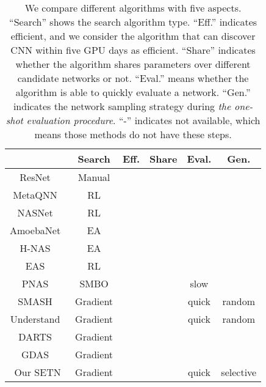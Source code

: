 \documentclass[10pt,twocolumn,letterpaper]{article}
\def\NAME{{SETN}}
\begin{document}
\begin{table}[t!]
\centering
\setlength{\tabcolsep}{2.6pt}
\begin{tabular}{| c | c | c | c | c | c |}\hline
                                         & Search    &   Eff.    & Share    & Eval.  & Gen. \\
\hline
  ResNet~\cite{he2016deep}               & Manual    &   &       &     &     \\
\hline
  MetaQNN~\cite{baker2017designing}      & RL        &   &  &     &     \\
  NASNet~\cite{Zoph_2018_CVPR}           & RL        &   &  &     &     \\
  AmoebaNet~\cite{real2019regularized}   & EA        &   &  &     &     \\
   H-NAS~\cite{liu2018hierarchical}      & EA        &   &  &     &     \\
  EAS~\cite{cai2018efficient}            & RL        &    &   &     &     \\
  PNAS~\cite{Liu_2018_ECCV}              & SMBO      &   &  & slow   &     \\
  SMASH~\cite{brock2018smash}            & Gradient  &    &  & quick  & random \\
Understand~\cite{bender2018understanding}& Gradient  &    &   & quick  & random \\
  DARTS~\cite{liu2019darts}              & Gradient  &    &   &     &     \\
  GDAS~\cite{dong2019search}             & Gradient  &    &   &     &     \\\hline
  Our {\NAME}                            & Gradient  &    &   & quick  & selective  \\
\hline
\end{tabular}
\vspace{1mm}
\caption{
We compare different algorithms with five aspects.
``Search'' shows the search algorithm type.
``Eff.'' indicates efficient, and we consider the algorithm that can discover CNN within five GPU days as efficient.
``Share'' indicates whether the algorithm shares parameters over different candidate networks or not.
``Eval.'' means whether the algorithm is able to quickly evaluate a network.
``Gen.'' indicates the network sampling strategy during \textit{the one-shot evaluation procedure}.
``-'' indicates not available, which means those methods do not have these steps.
}
\vspace{-4mm}
\label{table:compare-method-attribute}
\end{table}
\end{document}
